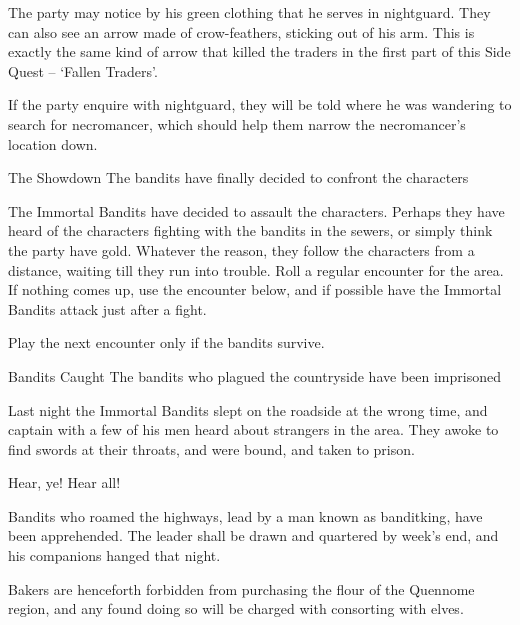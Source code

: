 \begin{multicols}{2}
The party may notice by his green clothing that he serves in \gls{nightguard}.
They can also see an arrow made of crow-feathers, sticking out of his arm.
This is exactly the same kind of arrow that killed the traders in the first part of this Side Quest -- `Fallen Traders'.


If the party enquire with \gls{nightguard}, they will be told where he was wandering to search for \gls{necromancer}, which should help them narrow the necromancer's location down.

{The Showdown}%
{The bandits have finally decided to confront the characters}%

The Immortal Bandits have decided to assault the characters.
Perhaps they have heard of the characters fighting with the bandits in the sewers, or simply think the party have gold.
Whatever the reason, they follow the characters from a distance, waiting till they run into trouble.
Roll a regular encounter for the area.
If nothing comes up, use the encounter below, and if possible have the Immortal Bandits attack just after a fight.


\banditking

Play the next encounter only if the bandits survive.

\resumecontents[Town]

{Bandits Caught}%
{The bandits who plagued the countryside have been imprisoned}%

\stopcontents[Town]

Last night the Immortal Bandits slept on the roadside at the wrong time, and \gls{captain} with a few of his men heard about strangers in the area.
They awoke to find swords at their throats, and were bound, and taken to prison.

\begin{boxtext}

	Hear, ye!  Hear all!

	Bandits who roamed the highways, lead by a man known as \gls{banditking}, have been apprehended.  The leader shall be drawn and quartered by week's end, and his companions hanged that night.

	Bakers are henceforth forbidden from purchasing the flour of the Quennome region, and any found doing so will be charged with consorting with elves.


\end{boxtext}
\end{multicols}
